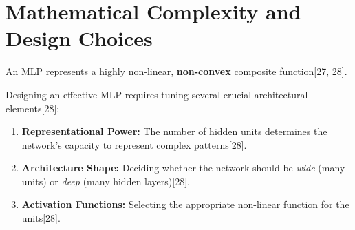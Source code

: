 \section*{Mathematical Complexity and Design Choices}

An MLP represents a highly non-linear, \textbf{non-convex} composite function[27, 28].

Designing an effective MLP requires tuning several crucial architectural elements[28]:
\begin{enumerate}
    \item \textbf{Representational Power:} The number of hidden units determines the network's capacity to represent complex patterns[28].
    \item \textbf{Architecture Shape:} Deciding whether the network should be \textit{wide} (many units) or \textit{deep} (many hidden layers)[28].
    \item \textbf{Activation Functions:} Selecting the appropriate non-linear function for the units[28].
\end{enumerate}

